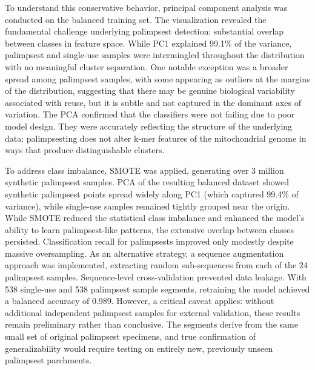 \documentclass[final]{anthology-ch} %
\begin{document}
To understand this conservative behavior, principal component analysis was conducted on the balanced training set. The visualization revealed the fundamental challenge underlying palimpsest detection: substantial overlap between classes in feature space. While PC1 explained 99.1\% of the variance, palimpsest and single-use samples were intermingled throughout the distribution with no meaningful cluster separation. One notable exception was a broader spread among palimpsest samples, with some appearing as outliers at the margins of the distribution, suggesting that there may be genuine biological variability associated with reuse, but it is subtle and not captured in the dominant axes of variation. The PCA confirmed that the classifiers were not failing due to poor model design. They were accurately reflecting the structure of the underlying data: palimpsesting does not alter k-mer features of the mitochondrial genome in ways that produce distinguishable clusters.

To address class imbalance, SMOTE was applied, generating over 3 million synthetic palimpsest samples. PCA of the resulting balanced dataset showed synthetic palimpsest points spread widely along PC1 (which captured 99.4\% of variance), while single-use samples remained tightly grouped near the origin. While SMOTE reduced the statistical class imbalance and enhanced the model's ability to learn palimpsest-like patterns, the extensive overlap between classes persisted. Classification recall for palimpsests improved only modestly despite massive oversampling. As an alternative strategy, a sequence augmentation approach was implemented, extracting random sub-sequences from each of the 24 palimpsest samples. Sequence-level cross-validation prevented data leakage. With 538 single-use and 538 palimpsest sample segments, retraining the model achieved a balanced accuracy of 0.989. However, a critical caveat applies: without additional independent palimpsest samples for external validation, these results remain preliminary rather than conclusive. The segments derive from the same small set of original palimpsest specimens, and true confirmation of generalizability would require testing on entirely new, previously unseen palimpsest parchments.
\end{document}
